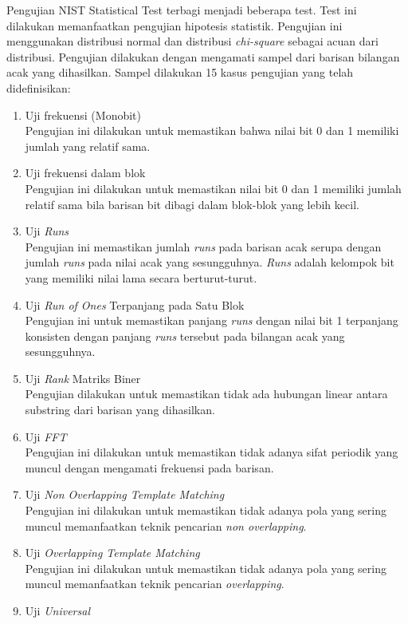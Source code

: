Pengujian NIST Statistical Test terbagi menjadi beberapa test. Test ini dilakukan memanfaatkan pengujian hipotesis statistik. Pengujian ini menggunakan distribusi normal dan distribusi \emph{chi-square} sebagai acuan dari distribusi. Pengujian dilakukan dengan mengamati sampel dari barisan bilangan acak yang dihasilkan. Sampel dilakukan 15 kasus pengujian yang telah didefinisikan:

\begin{enumerate}
  \item Uji frekuensi (Monobit) \\
  Pengujian ini dilakukan untuk memastikan bahwa nilai bit 0 dan 1 memiliki jumlah yang relatif sama.
  \item Uji frekuensi dalam blok \\
  Pengujian ini dilakukan untuk memastikan nilai bit 0 dan 1 memiliki jumlah relatif sama bila barisan bit dibagi dalam blok-blok yang lebih kecil.
  \item Uji \emph{Runs} \\
  Pengujian ini memastikan jumlah \emph{runs} pada barisan acak serupa dengan jumlah \emph{runs} pada nilai acak yang sesungguhnya. \emph{Runs} adalah kelompok bit yang memiliki nilai lama secara berturut-turut.
  \item Uji \emph{Run of Ones} Terpanjang pada Satu Blok \\
  Pengujian ini untuk memastikan panjang \emph{runs} dengan nilai bit 1 terpanjang konsisten dengan panjang \emph{runs} tersebut pada bilangan acak yang sesungguhnya.
  \item Uji \emph{Rank} Matriks Biner \\
  Pengujian dilakukan untuk memastikan tidak ada hubungan linear antara substring dari barisan yang dihasilkan.
  \item Uji \emph{FFT} \\
  Pengujian ini dilakukan untuk memastikan tidak adanya sifat periodik yang muncul dengan mengamati frekuensi pada barisan.
  \item Uji \emph{Non Overlapping Template Matching} \\
  Pengujian ini dilakukan untuk memastikan tidak adanya pola yang sering muncul memanfaatkan teknik pencarian \emph{non overlapping}.
  \item Uji \emph{Overlapping Template Matching} \\
  Pengujian ini dilakukan untuk memastikan tidak adanya pola yang sering muncul memanfaatkan teknik pencarian \emph{overlapping}.
  \item Uji \emph{Universal} \\

\end{enumerate}
